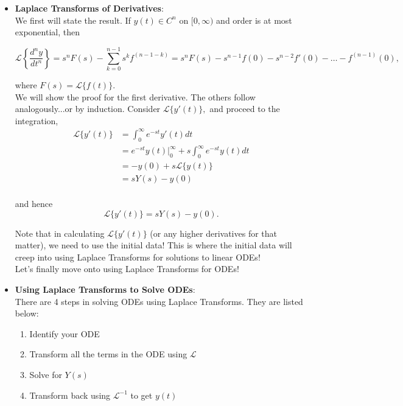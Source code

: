 \begin{itemize}
\item[] {\bf{Laplace Transforms of Derivatives}}: \\

We first will state the result. If $y(t)\in C^{n}$ on $[0,\infty)$ and order is at most exponential, then 

$$\mathscr{L}\left\{ \frac{d^n y}{dt^n } \right\} = s^n F(s) - \sum_{k=0}^{n-1} s^k f^{(n-1-k)} = s^n F(s) - s^{n-1}f(0) - s^{n-2} f'(0) -\ldots - f^{(n-1)}(0),$$

where $F(s) = \mathscr{L}\{ f(t) \}.$\\

We will show the proof for the first derivative. The others follow analogously...or by induction. Consider $\mathscr{L}\{ y'(t) \},$ and proceed to the integration,
\begin{align*}
\mathscr{L}\{ y'(t) \} &= \int_0^\infty e^{-st} y'(t) dt \\
&= e^{-st} y(t) \Big|_{0}^{\infty} + s\int_0^\infty e^{-st} y(t) dt \\
&= -y(0) + s\mathscr{L}\{ y(t) \} \\
&= sY(s) - y(0) \\
\end{align*} 

and hence $$\mathscr{L}\{ y'(t) \} = sY(s) - y(0).$$

Note that in calculating $\mathscr{L}\{ y'(t) \}$ (or any higher derivatives for that matter), we need to use the initial data! This is where the initial data will creep into using Laplace Transforms for solutions to linear ODEs!\\

Let's finally move onto using Laplace Transforms for ODEs!\\

\item[] {\bf{Using Laplace Transforms to Solve ODEs}}: \\

There are 4 steps in solving ODEs using Laplace Transforms. They are listed below:
\begin{enumerate}
\item Identify your ODE
\item Transform all the terms in the ODE using $\mathscr{L}$
\item Solve for $Y(s)$
\item Transform back using $\mathscr{L}^{-1}$ to get $y(t)$
\end{enumerate}


\end{itemize}
